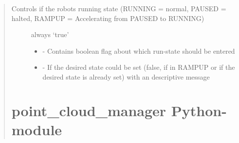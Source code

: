 \documentclass[letterpaper,10pt,english]{sphinxmanual}
\begin{document}
\begin{quote}
\begin{fulllineitems}
\begin{fulllineitems}
\begin{description}
\begin{itemize}
\end{itemize}

\end{description}


\end{fulllineitems}


\begin{fulllineitems}
\label{\detokenize{HardwareInterface:_CPPv2N21coppeliasim_interface17HardwareInterface8setPauseERN8std_srvs14SetBoolRequestERN8std_srvs15SetBoolResponseE}}%
\pysigstartmultiline
{}\label{\detokenize{HardwareInterface:project0classcoppeliasim__interface_1_1HardwareInterface_1a00cc87162beaecdf82c1510ae84b2d95}}%
\pysigstopmultiline
Controls if the robots running state (RUNNING = normal, PAUSED = halted, RAMPUP = Accelerating from PAUSED to RUNNING) 

\begin{description}
\item[{}] \leavevmode

always ‘true’ 


\item[{}] \leavevmode\begin{itemize}
\item {}  - 
Contains boolean flag about which run-state should be entered 

\item {}  - 
If the desired state could be set (false, if in RAMPUP or if the desired state is already set) with an descriptive message 

\end{itemize}

\end{description}


\end{fulllineitems}


\end{fulllineitems}



\chapter{point\_cloud\_manager Python-module}
\label{\detokenize{point_cloud_manager:point-cloud-manager-python-module}}\label{\detokenize{point_cloud_manager::doc}}\label{\detokenize{point_cloud_manager:point-cloud-manager}}


\end{quote}
\end{document}
